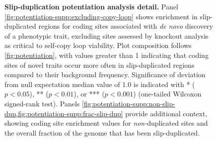 \begin{figure}
\caption{%
\textbf{Slip-duplication potentiation analysis detail.}
Panel \ref{fig:potentiation-supp:excluding-copy-loop} shows enrichment in slip-duplicated regions for coding sites associated with \textit{de novo} discovery of a phenotypic trait, excluding sites assessed by knockout analysis as critical to self-copy loop viability.
Plot composition follows \ref{fig:potentiation}, with values greater than 1 indicating that coding sites of novel traits occur more often in slip-duplicated regions compared to their background frequency.
  Significance of deviation from null expectation median value of 1.0 is indicated with * ($p < 0.05$), ** ($p < 0.01$), or *** ($p < 0.001$) (one-tailed Wilcoxon signed-rank test).
  Panels \cref{fig:potentiation-supp:non-slip-dup,fig:potentiation-supp:frac-slip-dup} provide additional context, showing coding site enrichment values for \textit{non-}duplicated sites and the overall fraction of the genome that has been slip-duplicated.
}
\label{fig:potentiation-supp}
\end{figure}



